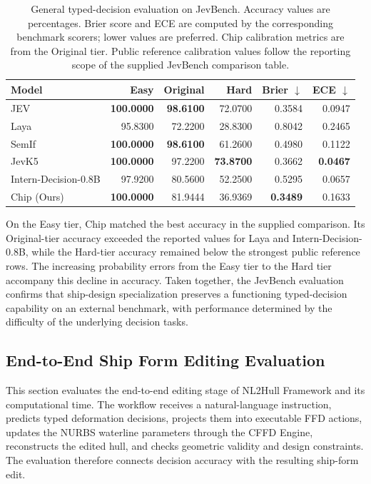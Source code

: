 \documentclass[a4paper,fleqn]{cas-dc}
\begin{document}
\begin{table}[t]
\caption{General typed-decision evaluation on JevBench. Accuracy values are
percentages. Brier score and ECE are computed by the
corresponding benchmark scorers; lower values are preferred. Chip calibration
metrics are from the Original tier. Public reference calibration values follow
the reporting scope of the supplied JevBench comparison table.}
\label{tab:jevbench-results}
\centering
\begin{tabular*}{\tblwidth}{@{\extracolsep{\fill}}lrrrrr@{}}
\toprule
Model & Easy & Original & Hard & Brier $\downarrow$ & ECE $\downarrow$ \\
\midrule
JEV                  & \textbf{100.0000} & \textbf{98.6100} & 72.0700 & 0.3584 & 0.0947 \\
Laya                 & 95.8300  & 72.2200 & 28.8300 & 0.8042 & 0.2465 \\
SemIf                & \textbf{100.0000} & \textbf{98.6100} & 61.2600 & 0.4980 & 0.1122 \\
JevK5                & \textbf{100.0000} & 97.2200 & \textbf{73.8700} & 0.3662 & \textbf{0.0467} \\
Intern-Decision-0.8B & 97.9200  & 80.5600 & 52.2500 & 0.5295 & 0.0657 \\
Chip (Ours)      & \textbf{100.0000} & 81.9444 & 36.9369 & \textbf{0.3489} & 0.1633 \\
\bottomrule
\end{tabular*}
\end{table}

On the Easy tier, Chip matched the best accuracy in the supplied comparison.
Its Original-tier accuracy exceeded the reported values for Laya and
Intern-Decision-0.8B, while the Hard-tier accuracy remained below the strongest
public reference rows. The increasing probability errors from the Easy tier to
the Hard tier accompany this decline in accuracy. Taken together, the JevBench
evaluation confirms
that ship-design specialization preserves a functioning typed-decision capability
on an external benchmark, with performance determined by the difficulty of the
underlying decision tasks.

\subsection{End-to-End Ship Form Editing Evaluation}
\label{sec:end-to-end}

This section evaluates the end-to-end editing stage of NL2Hull Framework and its
computational time. The workflow receives a natural-language instruction, predicts
typed deformation decisions, projects them into executable FFD actions, updates
the NURBS waterline parameters through the CFFD Engine, reconstructs the edited
hull, and checks geometric validity and design constraints. The evaluation therefore
connects decision accuracy with the resulting ship-form edit.
\end{document}
